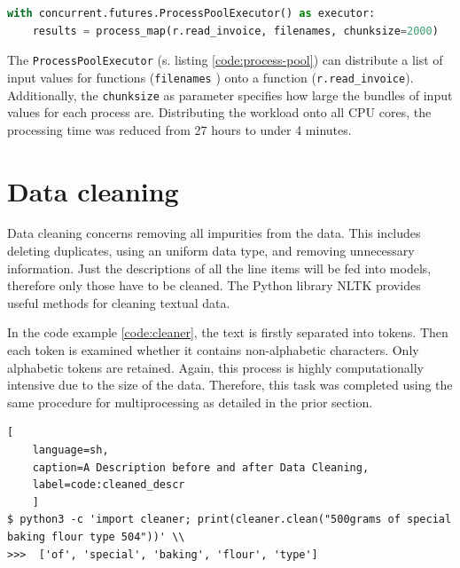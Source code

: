 \begin{lstlisting}[language=python, 
label=code:process-pool,
caption=Spawning a Process Pool in Python,
style=EigenerPythonStyle]   
with concurrent.futures.ProcessPoolExecutor() as executor:
	results = process_map(r.read_invoice, filenames, chunksize=2000)
\end{lstlisting}

	The \lstinline|ProcessPoolExecutor| (s. listing \ref{code:process-pool}) can distribute a list of input values for functions (\lstinline|filenames| ) onto a function (\lstinline|r.read_invoice|). Additionally, the \lstinline|chunksize| as parameter specifies how large the bundles of input values for each process are. Distributing the workload onto all \ac{CPU} cores, the processing time was reduced from 27 hours to under 4 minutes. 
	
	\section{Data cleaning}
	Data cleaning concerns removing all impurities from the data. This includes deleting duplicates, using an uniform data type, and removing unnecessary information.
	Just the descriptions of all the line items will be fed into models, therefore only those have to be cleaned. The Python library \ac{NLTK} provides useful methods for cleaning textual data.
	
	
	
	In the code example \ref{code:cleaner}, the text is firstly separated into tokens. Then each token is examined whether it contains non-alphabetic characters. Only alphabetic tokens are retained. Again, this process is highly computationally intensive due to the size of the data. Therefore, this task was completed using the same procedure for multiprocessing as detailed in the prior section.
	
\begin{lstlisting}[
	language=sh,
	caption=A Description before and after Data Cleaning,
	label=code:cleaned_descr
	]
$ python3 -c 'import cleaner; print(cleaner.clean("500grams of special baking flour type 504"))' \\
>>>  ['of', 'special', 'baking', 'flour', 'type']
\end{lstlisting}
	 
